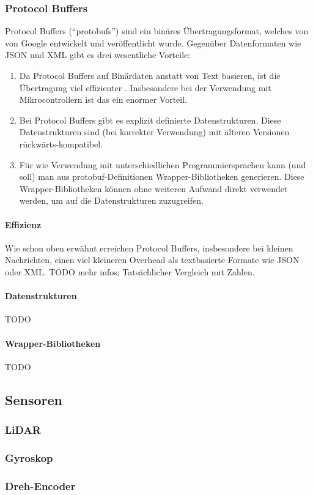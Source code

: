 \subsubsection{Protocol Buffers}
\label{subsec:ueberblick_protobufs}
Protocol Buffers \cite{protobufs} (``protobufs'') sind ein binäres Übertragungsformat,
welches von von Google entwickelt und veröffentlicht wurde.
%
Gegenüber Datenformaten wie JSON und XML gibt es drei wesentliche Vorteile:
\begin{enumerate}
    \item Da Protocol Buffers auf Binärdaten anstatt von Text basieren,
    ist die Übertragung viel effizienter \cite{7765670}.
    Insbesondere bei der Verwendung mit Mikrocontrollern ist das ein enormer Vorteil.

    \item Bei Protocol Buffers gibt es explizit definierte Datenstrukturen.
    Diese Datenstrukturen sind (bei korrekter Verwendung) mit älteren Versionen rückwärts-kompatibel.

    \item Für wie Verwendung mit unterschiedlichen Programmiersprachen kann (und soll) man aus protobuf-Definitionen
    Wrapper-Bibliotheken generieren.
    Diese Wrapper-Bibliotheken können ohne weiteren Aufwand direkt verwendet werden,
    um auf die Datenstrukturen zuzugreifen.
\end{enumerate}

\paragraph{Effizienz}
Wie schon oben erwähnt erreichen Protocol Buffers,
insbesondere bei kleinen Nachrichten,
einen viel kleineren Overhead als textbasierte Formate wie JSON oder XML.
%
TODO mehr infos; Tatsächlicher Vergleich mit Zahlen.


\paragraph{Datenstrukturen}
TODO

\paragraph{Wrapper-Bibliotheken}
TODO

\subsection{Sensoren}
\label{subsec:ueberblick_sensors}

\subsubsection{LiDAR}
\label{subsec:ueberblick_lidar}

\subsubsection{Gyroskop}
\label{subsec:ueberblick_gyro}

\subsubsection{Dreh-Encoder}
\label{subsec:ueberblick_rot_enc}